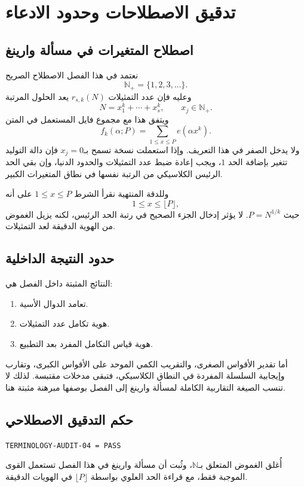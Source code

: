 \section{تدقيق الاصطلاحات وحدود الادعاء}

\subsection{اصطلاح المتغيرات في مسألة وارينغ}

نعتمد في هذا الفصل الاصطلاح الصريح
\[
\mathbb N_{+}=\{1,2,3,\ldots\}.
\]
وعليه فإن عدد التمثيلات $r_{s,k}(N)$ يعد الحلول المرتبة
\[
N=x_1^k+\cdots+x_s^k,
\qquad
x_j\in\mathbb N_{+}.
\]
ويتفق هذا مع مجموع فايل المستعمل في المتن
\[
f_k(\alpha;P)=\sum_{1\le x\le P}e(\alpha x^k).
\]
ولا يدخل الصفر في هذا التعريف. وإذا استعملت نسخة تسمح بـ$x_j=0$ فإن دالة التوليد تتغير بإضافة الحد $1$، ويجب إعادة ضبط عدد التمثيلات والحدود الدنيا، وإن بقي الحد الرئيس الكلاسيكي من الرتبة نفسها في نطاق المتغيرات الكبير.

وللدقة المنتهية نقرأ الشرط $1\le x\le P$ على أنه
\[
1\le x\le \lfloor P\rfloor,
\]
حيث $P=N^{1/k}$. لا يؤثر إدخال الجزء الصحيح في رتبة الحد الرئيس، لكنه يزيل الغموض من الهوية الدقيقة لعد التمثيلات.

\subsection{حدود النتيجة الداخلية}

النتائج المثبتة داخل الفصل هي:
\begin{enumerate}
\item تعامد الدوال الأسية.
\item هوية تكامل عدد التمثيلات.
\item هوية قياس التكامل المفرد بعد التطبيع.
\end{enumerate}
أما تقدير الأقواس الصغرى، والتقريب الكمي الموحد على الأقواس الكبرى، وتقارب وإيجابية السلسلة المفردة في النطاق الكلاسيكي، فتبقى مدخلات مقتبسة. لذلك لا تنسب الصيغة التقاربية الكاملة لمسألة وارينغ إلى الفصل بوصفها مبرهنة مثبتة هنا.

\subsection{حكم التدقيق الاصطلاحي}

\begin{center}
\texttt{TERMINOLOGY-AUDIT-04 = PASS}
\end{center}

أُغلق الغموض المتعلق بـ$\mathbb N$، وثُبت أن مسألة وارينغ في هذا الفصل تستعمل القوى الموجبة فقط، مع قراءة الحد العلوي بواسطة $\lfloor P\rfloor$ في الهويات الدقيقة.
